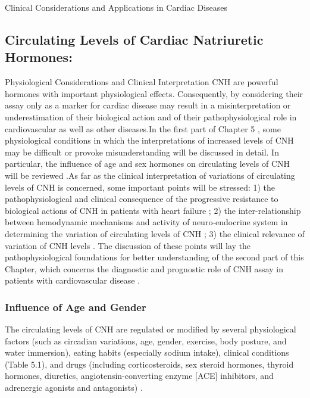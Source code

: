 \documentclass[14pt,a4paper,onecolumn]{extarticle}
\begin{document}
Clinical Considerations and Applications in Cardiac Diseases


\subsection{ Circulating Levels of Cardiac Natriuretic Hormones:}

Physiological Considerations and Clinical Interpretation
CNH are powerful hormones with important physiological effects. Consequently, by considering their assay only as a marker for cardiac disease may result in a misinterpretation
or underestimation of their biological action and of their pathophysiological role in cardiovascular as well as other diseases.In the first part of Chapter 5 ,
some physiological conditions in which the interpretations of increased levels of CNH
may be difficult or provoke misunderstanding will be discussed in detail. In particular,
the influence of age and sex hormones on circulating levels of CNH will be reviewed .As far as the clinical interpretation of variations of circulating levels of CNH is
concerned, some important points will be stressed: 1) the pathophysiological and clinical
consequence of the progressive resistance to biological actions of CNH in patients with
heart failure ; 2) the inter-relationship between hemodynamic mechanisms
and activity of neuro-endocrine system in determining the variation of circulating levels
of CNH ; 3) the clinical relevance of variation of CNH levels .
The discussion of these points will lay the pathophysiological foundations for better understanding of the second part of this Chapter, which concerns the diagnostic and prognostic role of CNH assay in patients with cardiovascular disease .

\subsubsection{ Influence of Age and Gender}

The circulating levels of CNH are regulated or modified by several physiological factors
(such as circadian variations, age, gender, exercise, body posture, and water immersion),
eating habits (especially sodium intake), clinical conditions (Table 5.1), and drugs (including corticosteroids, sex steroid hormones, thyroid hormones, diuretics, angiotensin-converting enzyme [ACE] inhibitors, and adrenergic agonists and antagonists) \citep{bib31} \citep{bib32} \citep{bib33} \citep{bib34} \citep{bib35} \citep{bib36}.
\end{document}
